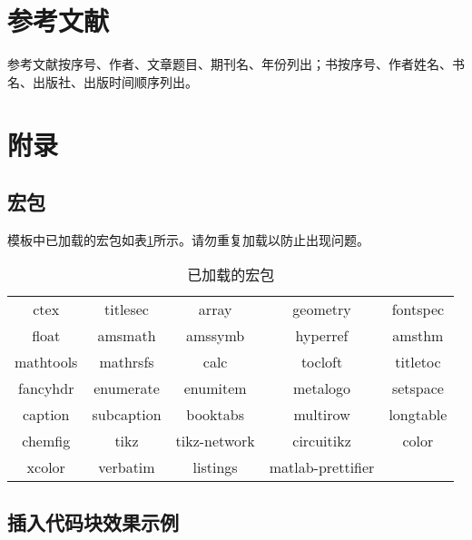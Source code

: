 \section{参考文献}

参考文献按序号、作者、文章题目、期刊名、年份列出；书按序号、作者姓名、书名、出版社、出版时间顺序列出。

\printbibliography[heading=none]

\newpage

\section{附录}

\subsection{宏包}

模板中已加载的宏包如表\ref{tab:packs}所示。请勿重复加载以防止出现问题。

\begin{table}[!h]
    \centering
    \caption{已加载的宏包}\label{tab:packs}
    \begin{tabular}{ccccc}
        \toprule
        ctex & titlesec & array & geometry & fontspec \\
        float & amsmath & amssymb & hyperref & amsthm \\
        mathtools & mathrsfs & calc & tocloft & titletoc \\
        fancyhdr & enumerate & enumitem & metalogo & setspace \\
        caption & subcaption & booktabs & multirow & longtable \\
        chemfig & tikz & tikz-network & circuitikz & color \\
        xcolor & verbatim & listings & matlab-prettifier &  \\
        \bottomrule
        \end{tabular}
\end{table}

\subsection{插入代码块效果示例}


